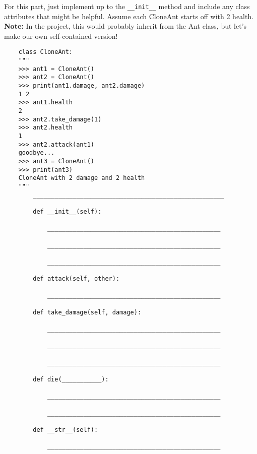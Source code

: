 \question For this part, just implement up to the \texttt{\_\_init\_\_} method and include any class attributes that might be helpful. Assume each CloneAnt starts off with 2 health. 
    \textbf{Note:} In the project, this would probably inherit from the Ant class, but let's make our own self-contained version!
    \newpage
    \begin{lstlisting}
    class CloneAnt:
    """
    >>> ant1 = CloneAnt()
    >>> ant2 = CloneAnt()
    >>> print(ant1.damage, ant2.damage)
    1 2
    >>> ant1.health
    2
    >>> ant2.take_damage(1)
    >>> ant2.health
    1
    >>> ant2.attack(ant1)
    goodbye...
    >>> ant3 = CloneAnt()
    >>> print(ant3)
    CloneAnt with 2 damage and 2 health
    """
        _____________________________________________________

        def __init__(self):

            ________________________________________________

            ________________________________________________

            ________________________________________________

        def attack(self, other):

            ________________________________________________

        def take_damage(self, damage):

            ________________________________________________

            ________________________________________________

            ________________________________________________

        def die(___________):

            ________________________________________________

            ________________________________________________

        def __str__(self):
           
            ________________________________________________
    \end{lstlisting}

